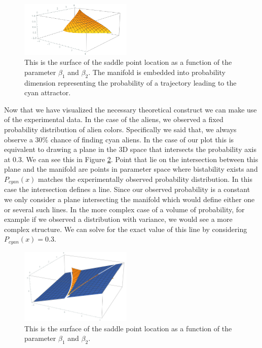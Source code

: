 \documentclass[letterpaper]{article}
\begin{document}
\begin{figure}[t]
\begin{center}
\includegraphics[width=2.1in,angle=0]{./saddle_cubic.png}
\caption{This is the surface of the saddle point location as a function of
the parameter $\beta_1$ and $\beta_2$. The manifold is embedded into probability
dimension representing the probability of a trajectory leading to the cyan attractor.}
\label{fig3}
\end{center}
\end{figure}

Now that we have visualized the necessary theoretical construct we can make use of  
the experimental data. In the case of the aliens, we observed a 
fixed probability distribution of alien colors. 
Specifically we said that, we always observe a $30\%$ chance of finding cyan aliens. 
In the case of our plot this is equivalent to drawing a plane in the 3D space that 
intersects the probability axis at $0.3$. We can see this in Figure \ref{fig4}. Point
that lie on the intersection between this plane and the manifold are points in parameter
space where bistability exists and $P_{cyan}(x)$ matches the experimentally observed 
probability distribution. In this case the intersection defines a line. Since our observed
probability is a constant we only consider a plane intersecting the manifold which would
define either one or several such lines. In the more complex case of a volume of probability,
for example if we observed a distribution with variance, we would see a more complex 
structure. We can solve for the exact value of this line by considering $P_{cyan}(x) = 0.3$.

\begin{figure}[t]
\begin{center}
\includegraphics[width=2.1in,angle=0]{./cubic_pg.png}
\caption{This is the surface of the saddle point location as a function of
the parameter $\beta_1$ and $\beta_2$.}
\label{fig4}
\end{center}
\end{figure}
\end{document}
